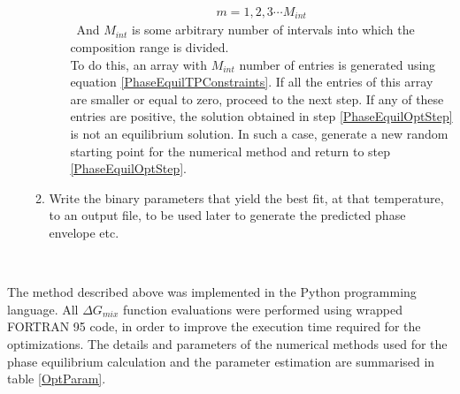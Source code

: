 \begin{enumerate}
\begin{enumerate}
\begin{enumerate}
\begin{eqnarray}
			m = 1,2,3 \cdots M_{int} \nonumber
			\end{eqnarray}\
			And $M_{int}$ is some arbitrary number of intervals into which the composition range is divided.\\
			To do this, an array with $M_{int}$ number of entries is generated using equation \ref{PhaseEquilTPConstraints}. If all the entries of 				this array are smaller or equal to zero, proceed to the next step. If any of these entries are positive, the solution obtained in step 				\ref{PhaseEquilOptStep} is not an equilibrium solution. In such a case, generate a new random starting point for the numerical method 				and return to step \ref{PhaseEquilOptStep}. 
		\end{enumerate}
		\item Write the binary parameters that yield the best fit, at that temperature, to an output file, to be used later to generate the predicted phase envelope etc.\		
	\end{enumerate}
\end{enumerate}\

The method described above was implemented in the Python programming language. All $\Delta G_{mix}$ function evaluations were performed using wrapped FORTRAN 95 code, in order to improve the execution time required for the optimizations. The details and parameters of the numerical methods used for the phase equilibrium calculation and the parameter estimation are summarised in table \ref{OptParam}.\\ 

